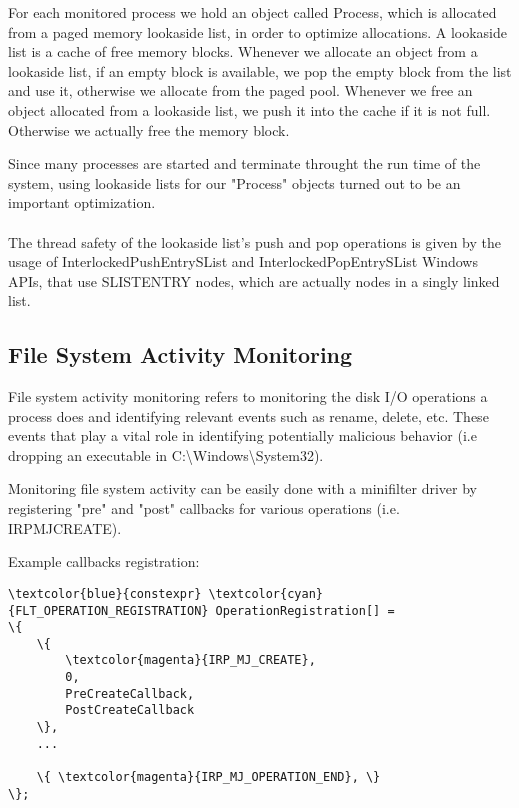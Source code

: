        For each monitored process we hold an object called Process, which is allocated from a paged memory lookaside list, in order to
        optimize allocations. A lookaside list is a cache of free memory blocks. Whenever we allocate an object from a lookaside list, if
        an empty block is available, we pop the empty block from the list and use it, otherwise we allocate from the paged pool. Whenever we
        free an object allocated from a lookaside list, we push it into the cache if it is not full. Otherwise we actually free the memory block.

        Since many processes are started and terminate throught the run time of the system, using lookaside lists for our "Process" objects
        turned out to be an important optimization.
        
        \paragraph{}
        The thread safety of the lookaside list's push and pop operations is given by the usage of InterlockedPushEntrySList and
        InterlockedPopEntrySList Windows APIs, that use SLIST\textunderscore ENTRY nodes, which are actually nodes in a singly linked list.

        \subsection{File System Activity Monitoring}
        File system activity monitoring refers to monitoring the disk I/O operations a process does and identifying relevant events such as
        rename, delete, etc. These events that play a vital role in identifying potentially malicious behavior (i.e dropping an executable in
        C:\textbackslash Windows\textbackslash System32).
        
        Monitoring file system activity can be easily done with a minifilter driver by
        registering "pre" and "post" callbacks for various operations (i.e. IRP\textunderscore MJ\textunderscore CREATE).

    Example callbacks registration:

    \begin{Verbatim}[fontsize=\small, commandchars=\\\{\}]
\textcolor{blue}{constexpr} \textcolor{cyan}{FLT_OPERATION_REGISTRATION} OperationRegistration[] =
\{
    \{
        \textcolor{magenta}{IRP_MJ_CREATE},
        0,
        PreCreateCallback,
        PostCreateCallback
    \},
    ...
    
    \{ \textcolor{magenta}{IRP_MJ_OPERATION_END}, \}
\};
    \end{Verbatim}

